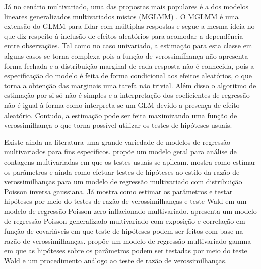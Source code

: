 Já no cenário multivariado, uma das propostas mais populares é a dos modelos lineares generalizados multivariados mistos (MGLMM) \citep{berridge2019multivariate}. O MGLMM é uma extensão do GLMM para lidar com múltiplas respostas e segue a mesma ideia no que diz respeito à inclusão de efeitos aleatórios para acomodar a dependência entre observações. Tal como no caso univariado, a estimação para esta classe em alguns casos se torna complexa pois a função de verossimilhança não apresenta forma fechada e a distribuição marginal de cada resposta não é conhecida, pois a especificação do modelo é feita de forma condicional aos efeitos aleatórios, o que torna a obtenção das marginais uma tarefa não trivial. Além disso o algoritmo de estimação por si só não é simples e a interpretação dos coeficientes de regressão não é igual à forma como interpreta-se um GLM devido a presença de efeito aleatório. Contudo, a estimação pode ser feita maximizando uma função de verossimilhança o que torna possível utilizar os testes de hipóteses usuais. 


Existe ainda na literatura uma grande variedade de modelos de regressão multivariados para fins específicos. \citet{zhang2017regression} propõe um modelo geral para análise de contagens multivariadas em que os testes usuais se aplicam. \citet{mardalena2020parameter} mostra como estimar os parâmetros e ainda como efetuar testes de hipóteses ao estilo da razão de verossimilhanças para um modelo de regressão multivariado com distribuição Poisson inversa gaussiana. Já \citet{sari2021estimation} mostra como estimar os parâmetros e testar hipóteses por meio do testes de razão de verossimilhanças e teste Wald em um modelo de regressão Poisson zero inflacionado multivariado. \citet{berliana2019multivariate} apresenta um modelo de regressão Poisson generalizado multivariado com exposição e correlação em função de covariáveis em que teste de hipóteses podem ser feitos com base na razão de verossimilhanças. \citet{rahayu2020multivariate} propõe um modelo de regressão multivariado gamma em que as hipóteses sobre os parâmetros podem ser testadas por meio do teste Wald e um procedimento análogo ao teste de razão de verossimilhanças.

